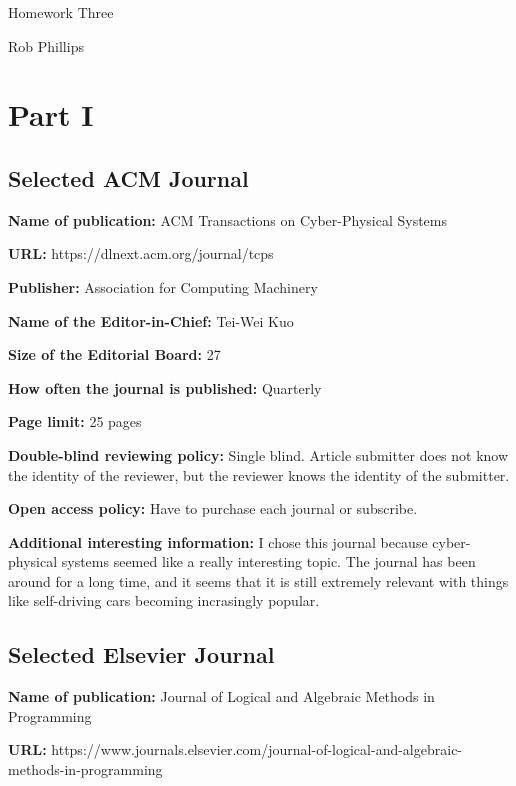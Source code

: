 \documentclass[a4paper,11pt]{article}
\begin{document}
\begin{center}
    \huge Homework Three
\end{center}

\begin{center}
    Rob Phillips
\end{center}

\section*{Part I}

\subsection*{Selected ACM Journal}

\textbf{Name of publication:} ACM Transactions on Cyber-Physical Systems

\textbf{URL:} https://dlnext.acm.org/journal/tcps

\textbf{Publisher:} Association for Computing Machinery

\textbf{Name of the Editor-in-Chief:} Tei-Wei Kuo

\textbf{Size of the Editorial Board:} 27

\textbf{How often the journal is published:} Quarterly

\textbf{Page limit:} 25 pages

\textbf{Double-blind reviewing policy:} Single blind. Article submitter does not know the identity of the reviewer, but the reviewer knows the identity of the submitter.

\textbf{Open access policy:} Have to purchase each journal or subscribe.

\textbf{Additional interesting information:} I chose this journal because cyber-physical systems seemed like a really interesting topic. The journal has been around for a long time, and it seems that it is still extremely relevant with things like self-driving cars becoming incrasingly popular. 

\subsection*{Selected Elsevier Journal}

\textbf{Name of publication:} Journal of Logical and Algebraic Methods in Programming

\textbf{URL:} https://www.journals.elsevier.com/journal-of-logical-and-algebraic-methods-in-programming
\end{document}
